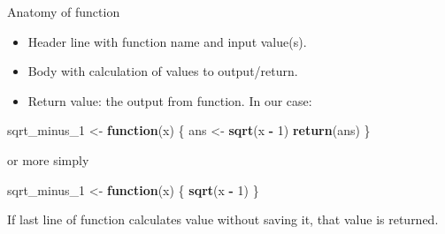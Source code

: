 \documentclass[ignorenonframetext,]{beamer}
\newenvironment{Shaded}{\begin{snugshade}}{\end{snugshade}}
\newcommand{\ControlFlowTok}[1]{\textcolor[rgb]{0.13,0.29,0.53}{\textbf{#1}}}
\newcommand{\DecValTok}[1]{\textcolor[rgb]{0.00,0.00,0.81}{#1}}
\newcommand{\KeywordTok}[1]{\textcolor[rgb]{0.13,0.29,0.53}{\textbf{#1}}}
\newcommand{\NormalTok}[1]{#1}
\newcommand{\OperatorTok}[1]{\textcolor[rgb]{0.81,0.36,0.00}{\textbf{#1}}}
\newcommand{\StringTok}[1]{\textcolor[rgb]{0.31,0.60,0.02}{#1}}
\providecommand{\tightlist}{%
  \setlength{\itemsep}{0pt}\setlength{\parskip}{0pt}}
\begin{document}
\begin{frame}[fragile]{Anatomy of function}
\protect\hypertarget{anatomy-of-function}{}

\begin{itemize}
\tightlist
\item
  Header line with function name and input value(s).
\item
  Body with calculation of values to output/return.
\item
  Return value: the output from function. In our case:
\end{itemize}

\begin{Shaded}
\begin{Highlighting}[]
\NormalTok{sqrt_minus_}\DecValTok{1}\NormalTok{ <-}\StringTok{ }\ControlFlowTok{function}\NormalTok{(x) \{}
\NormalTok{  ans <-}\StringTok{ }\KeywordTok{sqrt}\NormalTok{(x }\OperatorTok{-}\StringTok{ }\DecValTok{1}\NormalTok{)}
  \KeywordTok{return}\NormalTok{(ans)}
\NormalTok{\}}
\end{Highlighting}
\end{Shaded}

or more simply

\begin{Shaded}
\begin{Highlighting}[]
\NormalTok{sqrt_minus_}\DecValTok{1}\NormalTok{ <-}\StringTok{ }\ControlFlowTok{function}\NormalTok{(x) \{}
  \KeywordTok{sqrt}\NormalTok{(x }\OperatorTok{-}\StringTok{ }\DecValTok{1}\NormalTok{)}
\NormalTok{\}}
\end{Highlighting}
\end{Shaded}

If last line of function calculates value without saving it, that value
is returned.

\end{frame}
\end{document}
